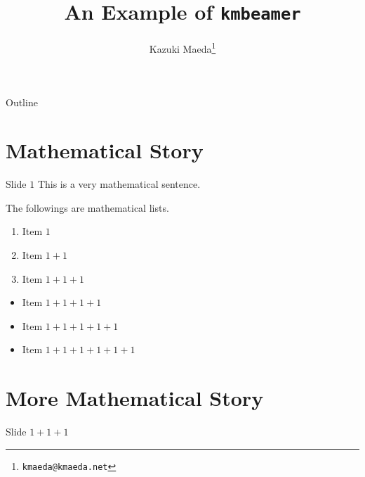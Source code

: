 \documentclass{beamer}
\title{An Example of \texttt{kmbeamer}}
\author{Kazuki Maeda\footnote{\texttt{kmaeda@kmaeda.net}}}
\begin{document}
\begin{frame}
  \maketitle
\end{frame}

\begin{frame}{Outline}
  \tableofcontents
\end{frame}

\section{Mathematical Story}

\begin{frame}{Slide $1$}
  This is a very mathematical sentence.

  \pause

  The followings are mathematical lists.

  \begin{enumerate}
  \item Item $1$\pause
  \item Item $1+1$\pause
  \item Item $1+1+1$
  \end{enumerate}

  \pause

  \begin{itemize}
  \item Item $1+1+1+1$\pause
  \item Item $1+1+1+1+1$\pause
  \item Item $1+1+1+1+1+1$
  \end{itemize}
\end{frame}


\section{More Mathematical Story}
\begin{frame}{Slide $1+1+1$}
  \lipsum[1]
\end{frame}
\end{document}
